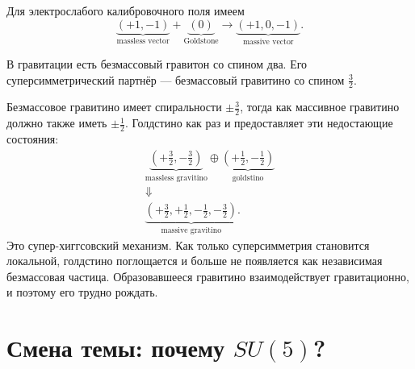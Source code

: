 Для электрослабого калибровочного поля имеем
\begin{equation}
\underbrace{(+1,-1)}_{\text{massless vector}}
+
\underbrace{(0)}_{\text{Goldstone}}
\longrightarrow
\underbrace{(+1,0,-1)}_{\text{massive vector}}.
\label{eq:l9-higgs-count}
\end{equation}

\begin{classroomqa}
\end{classroomqa}

В гравитации есть безмассовый гравитон со спином два. Его суперсимметрический партнёр — безмассовый гравитино со спином \(\tfrac32\).

\begin{classroomqa}
\end{classroomqa}

Безмассовое гравитино имеет спиральности \(\pm\tfrac32\), тогда как массивное гравитино должно также иметь \(\pm\tfrac12\). Голдстино как раз и предоставляет эти недостающие состояния:
\begin{equation}
\begin{gathered}
\underbrace{\left(+\frac32,-\frac32\right)}_{\text{massless gravitino}}
\oplus
\underbrace{\left(+\frac12,-\frac12\right)}_{\text{goldstino}}\\
\Downarrow\\
\underbrace{\left(+\frac32,+\frac12,-\frac12,-\frac32\right)}_{\text{massive gravitino}}.
\end{gathered}
\label{eq:l9-super-higgs}
\end{equation}
Это супер-хиггсовский механизм. Как только суперсимметрия становится локальной, голдстино поглощается и больше не появляется как независимая безмассовая частица. Образовавшееся гравитино взаимодействует гравитационно, и поэтому его трудно рождать.

\section{Смена темы: почему \texorpdfstring{\(SU(5)\)}{SU(5)}?}

